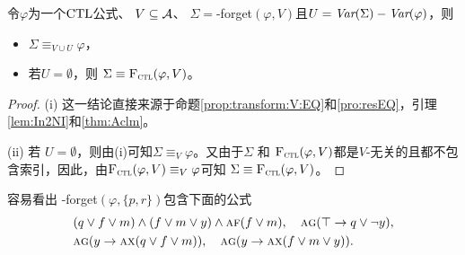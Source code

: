 \begin{theorem}\label{thm:soundness:forget:algorithm}
	令$\varphi$为一个$\textrm{CTL}$公式、 $V\subseteq\cal A$、 $\Sigma=$\CTL-forget$(\varphi,V)$且$U=\textit{Var}(\Sigma)-\textit{Var}(\varphi)$，则
	\begin{itemize}
		\item[(i)] $\Sigma\equiv_{V\cup U}\varphi$，
		\item[(ii)] 若$U=\emptyset$，则 $\Sigma\equiv{\textsc{F}_{\textsc{ctl}}}(\varphi,V)$。
	\end{itemize}
\end{theorem}
\begin{proof}
	(i) 这一结论直接来源于命题\ref{prop:transform:V:EQ}和\ref{pro:resEQ}，引理\ref{lem:In2NI}和\ref{thm:Aclm}。
	
	(ii) 若 $U=\emptyset$，则由(i)可知$\Sigma\equiv_{V}\varphi$。又由于$\Sigma$ 和 ${\textsc{F}_{\textsc{ctl}}}(\varphi,V)$都是$V$-无关的且都不包含索引，因此，由${\textsc{F}_{\textsc{ctl}}}(\varphi,V) \equiv_V \varphi$可知 $\Sigma\equiv{\textsc{F}_{\textsc{ctl}}}(\varphi,V)$。
\end{proof}


\begin{example}\label{examp:forget:algorithm}
	容易看出 \CTL-forget$(\varphi,\{p,r\})$包含下面的公式
	\begin{align*}%
		&  (q \vee f \vee m)\land (f \vee m \vee y)\land\ALL \FUTURE (f \vee m), \quad \ALL\GLOBAL ( \top \rto q\vee\neg y),  \\
		&  \ALL\GLOBAL(y \rto \ALL\NEXT(q \vee f\vee m)), \quad \ALL\GLOBAL( y \rto \ALL\NEXT(f\vee m\vee y)).
	\end{align*}
\end{example}


